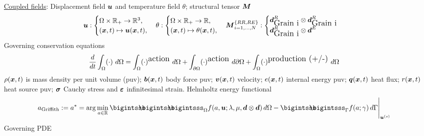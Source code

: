 \documentclass[25pt, a0paper,
portrait,
margin=2mm, 
innermargin=2mm, 
blockverticalspace=7mm, %
colspace=2mm, %
subcolspace=0mm]{tikzposter}
\begin{document}
{
	\begin{minipage}{0.43\textwidth}
		\begin{mdframed}
			\underline{Coupled fields}: Displacement field ${\boldsymbol{\mathnormal u}}$ and temperature field $\theta$; structural tensor ${\boldsymbol{\mathnormal M}}$
			\begin{align*}
				\Bu:
				\begin{cases}
					\Omega \times \mathbb{R}_{+} \rightarrow \mathbb{R}^3, \\
					(\Bx,t) \mapsto \Bu(\Bx,t),
				\end{cases}
				\theta:
				\begin{cases}
					\Omega \times \mathbb{R}_{+} \rightarrow \mathbb{R}, \\
					(\Bx,t) \mapsto \theta(\Bx,t),
				\end{cases}
				\BM^{\{RR,RE\}}_{i=1,\dots,N}:
				\begin{cases}
					\Bd^{R}_{\text{\tiny Grain i}} \otimes \Bd^{R}_{\text{\tiny Grain i}} 
					\\
					\Bd^{R}_{\text{\tiny Grain i}} \otimes \Bd^{E}
				\end{cases}
			\end{align*}
			Governing conservation equations
			\begin{align*}
				\frac{d}{dt} \int_{\Omega}(\cdot)\ d\Omega = \int_{\Omega}(\cdot)^{\text{\tiny action}}\ d\Omega 
				+ \int_{\partial\Omega}(\cdot)^{\text{\tiny action}}\ d\partial\Omega  
				+ \int_{\Omega}(\cdot)^{\text{\tiny production (+/-)}}\ d\Omega
			\end{align*}
			$\rho({\boldsymbol{\mathnormal x}},t)$ is mass density per unit volume (puv); 
			${\boldsymbol{\mathnormal b}}({\boldsymbol{\mathnormal x}},t)$ body force puv; 
			${\boldsymbol{\mathnormal v}}({\boldsymbol{\mathnormal x}},t)$ velocity; 
			$e({\boldsymbol{\mathnormal x}},t)$ internal energy puv; 
			${\boldsymbol{\mathnormal q}}({\boldsymbol{\mathnormal x}},t)$ heat flux; 
			$r({\boldsymbol{\mathnormal x}},t)$ heat source puv; 
			${\boldsymbol{\sigma}}$ Cauchy stress and 
			${\boldsymbol{\varepsilon}}$ infinitesimal strain.
			Helmholtz energy functional 
			\begin{align*}
				a_{\text{Griffith}} := a^{*} = \arg\min_{a\in\mathbb{R}}{\bigintsss\!\!\!\!\!\!\bigintsss\!\!\!\!\!\!\bigintsss_{\Omega} f(a,\bm{u};\lambda,\mu,\bm{d}\otimes\bm{d}) \, d\Omega - \bigintsss\!\!\!\!\!\!\bigintsss_{\Gamma} f(a;\gamma) \, d\Gamma}\Bigg|_{\bm{u}^{(s)}}
			\end{align*}
			Governing PDE

\end{mdframed}
\end{minipage}}
\end{document}
